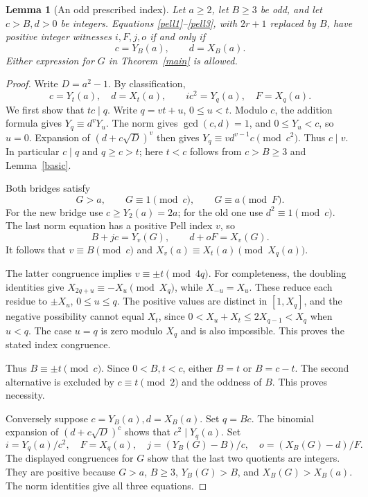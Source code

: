 \documentclass[11pt]{article}
\newtheorem{lemma}[theorem]{Lemma}
\begin{document}
\begin{lemma}[An odd prescribed index]\label{index}
Let \(a\ge2\), let \(B\ge3\) be odd, and let \(c>B,d>0\)
be integers.  Equations \eqref{pell1}--\eqref{pell3}, with
\(2r+1\) replaced by \(B\), have positive integer witnesses
\(i,F,j,o\) if and only if
\[
                         c=Y_B(a),\qquad d=X_B(a).
\]
Either expression for \(G\) in Theorem~\ref{main} is allowed.
\end{lemma}
\begin{proof}
Write \(D=a^2-1\).  By classification,
\[
 c=Y_t(a),\quad d=X_t(a),\qquad ic^2=Y_q(a),\quad F=X_q(a).
\]
We first show that \(tc\mid q\).  Write \(q=vt+u\),
\(0\le u<t\).  Modulo \(c\), the addition formula gives
\(Y_q\equiv d^vY_u\).  The norm gives \(\gcd(c,d)=1\),
and \(0\le Y_u<c\), so \(u=0\).  Expansion of
\((d+c\sqrt D)^v\) then gives
\(Y_q\equiv vd^{v-1}c\pmod{c^2}\).  Thus \(c\mid v\).
In particular \(c\mid q\) and \(q\ge c>t\); here
\(t<c\) follows from \(c>B\ge3\) and Lemma~\ref{basic}.

Both bridges satisfy
\[
             G>a,\qquad G\equiv1\pmod c,
                       \qquad G\equiv a\pmod F.
\]
For the new bridge use \(c\ge Y_2(a)=2a\); for the old
one use \(d^2\equiv1\pmod c\).  The last norm equation
has a positive Pell index \(v\), so
\[
             B+jc=Y_v(G),\qquad d+oF=X_v(G).
\]
It follows that \(v\equiv B\pmod c\) and
\(X_v(a)\equiv X_t(a)\pmod{X_q(a)}\).

The latter congruence implies \(v\equiv\pm t\pmod{4q}\).
For completeness, the doubling identities give
\(X_{2q+u}\equiv-X_u\pmod{X_q}\), while \(X_{-u}=X_u\).
These reduce each residue to \(\pm X_u\), \(0\le u\le q\).
The positive values are distinct in \([1,X_q]\), and the
negative possibility cannot equal \(X_t\), since
\(0<X_u+X_t\le2X_{q-1}<X_q\) when \(u<q\).
The case \(u=q\) is zero modulo \(X_q\) and is also impossible.
This proves the stated index congruence.

Thus \(B\equiv\pm t\pmod c\).  Since \(0<B,t<c\),
either \(B=t\) or \(B=c-t\).  The second alternative is
excluded by \(c\equiv t\pmod2\) and the oddness of \(B\).
This proves necessity.

Conversely suppose \(c=Y_B(a),d=X_B(a)\).  Set \(q=Bc\).
The binomial expansion of \((d+c\sqrt D)^c\) shows that
\(c^2\mid Y_q(a)\).  Set
\[
 i=Y_q(a)/c^2,\quad F=X_q(a),\quad
 j=(Y_B(G)-B)/c,\quad o=(X_B(G)-d)/F.
\]
The displayed congruences for \(G\) show that the last two
quotients are integers.  They are positive because \(G>a\),
\(B\ge3\), \(Y_B(G)>B\), and \(X_B(G)>X_B(a)\).
The norm identities give all three equations.
\end{proof}
\end{document}

